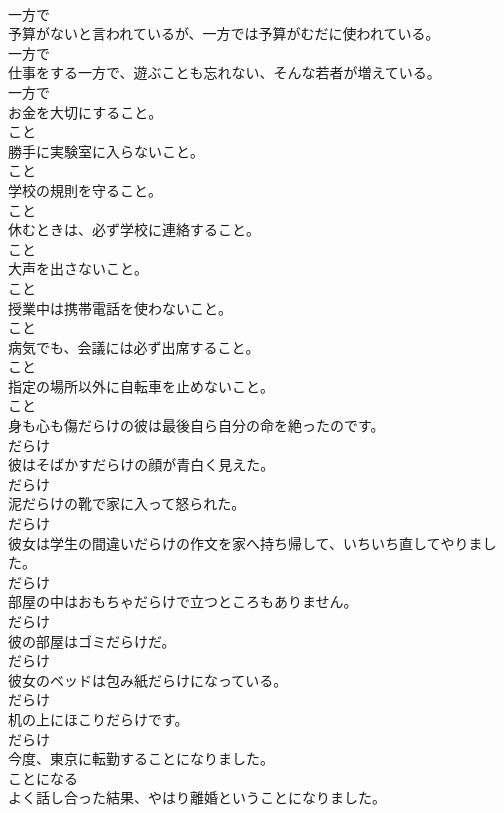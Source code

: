 \documentclass[8pt]{extreport}
\begin{document}
\begin{CJK}{UTF8}{min}
\\	一方で	
\\	予算がないと言われているが、一方では予算がむだに使われている。	
\\	一方で	
\\	仕事をする一方で、遊ぶことも忘れない、そんな若者が増えている。	
\\	一方で	
\\	お金を大切にすること。	
\\	こと	
\\	勝手に実験室に入らないこと。	
\\	こと	
\\	学校の規則を守ること。	
\\	こと	
\\	休むときは、必ず学校に連絡すること。	
\\	こと	
\\	大声を出さないこと。	
\\	こと	
\\	授業中は携帯電話を使わないこと。	
\\	こと	
\\	病気でも、会議には必ず出席すること。	
\\	こと	
\\	指定の場所以外に自転車を止めないこと。	
\\	こと	
\\	身も心も傷だらけの彼は最後自ら自分の命を絶ったのです。	
\\	だらけ	
\\	彼はそばかすだらけの顔が青白く見えた。	
\\	だらけ	
\\	泥だらけの靴で家に入って怒られた。	
\\	だらけ	
\\	彼女は学生の間違いだらけの作文を家へ持ち帰して、いちいち直してやりました。	
\\	だらけ	
\\	部屋の中はおもちゃだらけで立つところもありません。	
\\	だらけ	
\\	彼の部屋はゴミだらけだ。	
\\	だらけ	
\\	彼女のベッドは包み紙だらけになっている。	
\\	だらけ	
\\	机の上にほこりだらけです。	
\\	だらけ	
\\	今度、東京に転勤することになりました。	
\\	ことになる	
\\	よく話し合った結果、やはり離婚ということになりました。	

\end{CJK}
\end{document}
